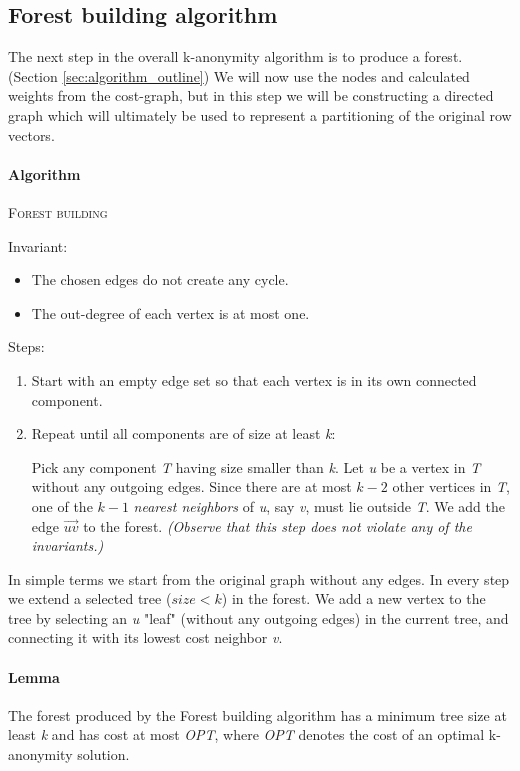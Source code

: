 \subsection{Forest building algorithm}

The next step in the overall k-anonymity algorithm is to produce a forest. (Section \ref{sec:algorithm_outline}) We will now use the nodes and calculated weights from the cost-graph, but in this step we will be constructing a directed graph which will ultimately be used to represent a partitioning of the original row vectors.

\paragraph{Algorithm} \textsc{Forest building} \cite{aggarwal}

Invariant:
\begin{itemize}
	\item The chosen edges do not create any cycle.
	\item The out-degree of each vertex is at most one.
\end{itemize}

Steps:
\begin{enumerate}
	\item Start with an empty edge set so that each vertex is in its own connected component.
	\item Repeat until all components are of size at least \textit{k}: \par
	Pick any component \textit{T} having size smaller than \textit{k}. Let \textit{u} be a vertex in \textit{T} without any outgoing edges. Since there are at most \(k-2\) other vertices in \textit{T}, one of the \(k-1\) \emph{nearest neighbors} of \textit{u}, say \textit{v}, must lie outside \textit{T}. We add the edge \(\vec{uv}\) to the forest. \textit{(Observe that this step does not violate any of the invariants.)}
\end{enumerate}

\vspace{\baselineskip}

In simple terms we start from the original graph without any edges. In every step we extend a selected tree (\(size < k\)) in the forest. We add a new vertex to the tree by selecting an \textit{u} "leaf" (without any outgoing edges) in the current tree, and connecting it with its lowest cost neighbor \textit{v}.

\paragraph{Lemma} The forest produced by the Forest building algorithm has a minimum tree size at least \textit{k} and has cost at most \textit{OPT}, where \textit{OPT} denotes the cost of an optimal k-anonymity solution. \cite{aggarwal}

